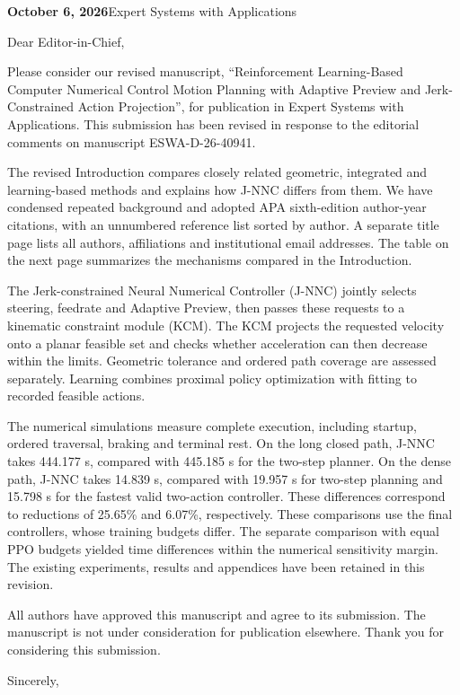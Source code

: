 \documentclass[10pt,a4paper]{article}
\begin{document}
\textbf{October 6, 2026}\hfill Expert Systems with Applications

Dear Editor-in-Chief,

Please consider our revised manuscript, ``Reinforcement Learning-Based Computer Numerical Control Motion Planning with Adaptive Preview and Jerk-Constrained Action Projection'', for publication in Expert Systems with Applications. This submission has been revised in response to the editorial comments on manuscript ESWA-D-26-40941.

The revised Introduction compares closely related geometric, integrated and learning-based methods and explains how J-NNC differs from them. We have condensed repeated background and adopted APA sixth-edition author-year citations, with an unnumbered reference list sorted by author. A separate title page lists all authors, affiliations and institutional email addresses. The table on the next page summarizes the mechanisms compared in the Introduction.

The Jerk-constrained Neural Numerical Controller (J-NNC) jointly selects steering, feedrate and Adaptive Preview, then passes these requests to a kinematic constraint module (KCM). The KCM projects the requested velocity onto a planar feasible set and checks whether acceleration can then decrease within the limits. Geometric tolerance and ordered path coverage are assessed separately. Learning combines proximal policy optimization with fitting to recorded feasible actions.

The numerical simulations measure complete execution, including startup, ordered traversal, braking and terminal rest. On the long closed path, J-NNC takes 444.177 s, compared with 445.185 s for the two-step planner. On the dense path, J-NNC takes 14.839 s, compared with 19.957 s for two-step planning and 15.798 s for the fastest valid two-action controller. These differences correspond to reductions of 25.65\% and 6.07\%, respectively. These comparisons use the final controllers, whose training budgets differ. The separate comparison with equal PPO budgets yielded time differences within the numerical sensitivity margin. The existing experiments, results and appendices have been retained in this revision.

All authors have approved this manuscript and agree to its submission. The manuscript is not under consideration for publication elsewhere. Thank you for considering this submission.

Sincerely,
\end{document}
